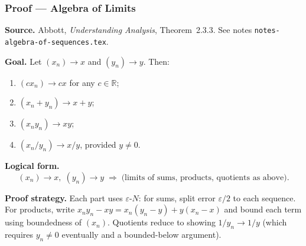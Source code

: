 
\clearpage
{}
\hypertarget{proof-RA-ABB-P-algebra-limits}{}

\subsubsection[Algebra of Limits]{Proof --- Algebra of Limits}

\bigskip

\noindent
\textbf{Source.}
Abbott, \emph{Understanding Analysis}, Theorem~2.3.3.
See notes \texttt{notes-algebra-of-sequences.tex}.

\vspace{0.75em}

\noindent
\textbf{Goal.}
Let $(x_n) \to x$ and $(y_n) \to y$. Then:
\begin{enumerate}
  \item $(cx_n) \to cx$ for any $c \in \mathbb{R}$;
  \item $(x_n + y_n) \to x + y$;
  \item $(x_n y_n) \to xy$;
  \item $(x_n / y_n) \to x/y$, provided $y \ne 0$.
\end{enumerate}

\vspace{0.75em}

\noindent
\textbf{Logical form.}
\[
  (x_n) \to x,\; (y_n) \to y
  \;\Rightarrow\;
  \text{(limits of sums, products, quotients as above).}
\]

\vspace{0.75em}

\noindent
\textbf{Proof strategy.}
Each part uses $\varepsilon$-$N$: for sums, split error $\varepsilon/2$ to each sequence.
For products, write $x_n y_n - xy = x_n(y_n - y) + y(x_n - x)$ and bound
each term using boundedness of $(x_n)$. Quotients reduce to showing
$1/y_n \to 1/y$ (which requires $y_n \ne 0$ eventually and a bounded-below
argument).

\vspace{0.75em}

